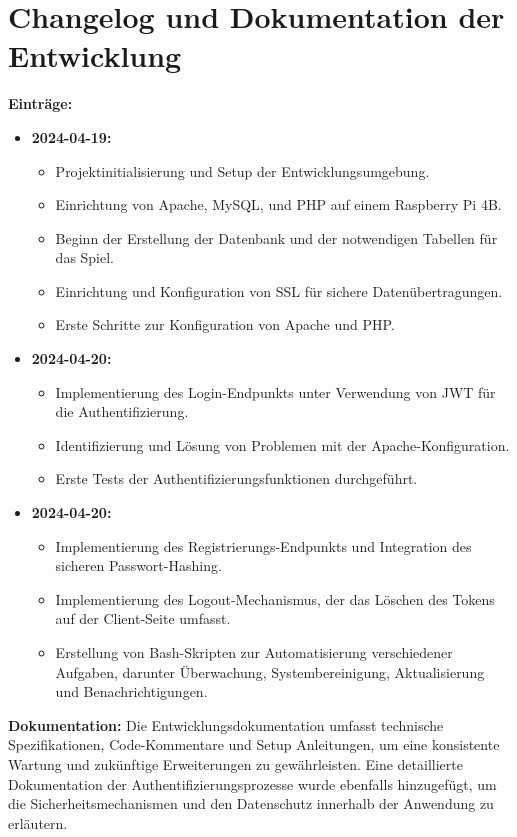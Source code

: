\documentclass{article}
\begin{document}
\section{Changelog und Dokumentation der Entwicklung}
\textbf{Einträge:}
\begin{itemize}
    \item \textbf{2024-04-19:} 
        \begin{itemize}
            \item Projektinitialisierung und Setup der Entwicklungsumgebung.
            \item Einrichtung von Apache, MySQL, und PHP auf einem Raspberry Pi 4B.
            \item Beginn der Erstellung der Datenbank und der notwendigen Tabellen für das Spiel.
            \item Einrichtung und Konfiguration von SSL für sichere Datenübertragungen.
            \item Erste Schritte zur Konfiguration von Apache und PHP.
        \end{itemize}
    \item \textbf{2024-04-20:}
        \begin{itemize}
            \item Implementierung des Login-Endpunkts unter Verwendung von JWT für die Authentifizierung.
            \item Identifizierung und Lösung von Problemen mit der Apache-Konfiguration.
            \item Erste Tests der Authentifizierungsfunktionen durchgeführt.
        \end{itemize}
    \item \textbf{2024-04-20:} 
        \begin{itemize}
            \item Implementierung des Registrierungs-Endpunkts und Integration des sicheren \newline Passwort-Hashing.
            \item Implementierung des Logout-Mechanismus, der das Löschen des Tokens auf der Client-Seite umfasst.
            \item Erstellung von Bash-Skripten zur Automatisierung verschiedener Aufgaben, darunter \newline Überwachung, Systembereinigung, Aktualisierung und Benachrichtigungen.
        \end{itemize}
\end{itemize}

\vspace{1em}
\textbf{Dokumentation:} \newline
Die Entwicklungsdokumentation umfasst technische Spezifikationen, Code-Kommentare und Setup Anleitungen, um eine konsistente Wartung und zukünftige Erweiterungen zu gewährleisten. Eine detaillierte Dokumentation der Authentifizierungsprozesse wurde ebenfalls hinzugefügt, um die Sicherheitsmechanismen und den Datenschutz innerhalb der Anwendung zu erläutern.



	
\end{document}

